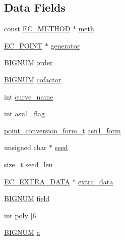 \subsection*{Data Fields}
\begin{DoxyCompactItemize}
\item 
const \hyperlink{crypto_2ec_2ec_8h_aeb4d9daf18f9bdcdb57abb1d97aa86c0}{E\+C\+\_\+\+M\+E\+T\+H\+OD} $\ast$ \hyperlink{structec__group__st_a2fc1498c0eb6bf4c024e00e73b172708}{meth}
\item 
\hyperlink{crypto_2ec_2ec_8h_ab372a34de16c42eb0ccfa63be0ad985f}{E\+C\+\_\+\+P\+O\+I\+NT} $\ast$ \hyperlink{structec__group__st_aa6cf7be35e1604915acde9174f0888c9}{generator}
\item 
\hyperlink{crypto_2ossl__typ_8h_a6fb19728907ec6515e4bfb716bffa141}{B\+I\+G\+N\+UM} \hyperlink{structec__group__st_a77ca4f31a55ba52d5c350376df44359a}{order}
\item 
\hyperlink{crypto_2ossl__typ_8h_a6fb19728907ec6515e4bfb716bffa141}{B\+I\+G\+N\+UM} \hyperlink{structec__group__st_a9f1826ab76db9a14f11e55a10d52fd7d}{cofactor}
\item 
int \hyperlink{structec__group__st_aa16a620b3b36d3f73e4e87e76bfcdad4}{curve\+\_\+name}
\item 
int \hyperlink{structec__group__st_a807067efd2305e23273f7046c7518150}{asn1\+\_\+flag}
\item 
\hyperlink{crypto_2ec_2ec_8h_aa2c7ec2902c397d59393d357921e14b5}{point\+\_\+conversion\+\_\+form\+\_\+t} \hyperlink{structec__group__st_a6f1f3af1fd02a6cffd8e3313ac201fe8}{asn1\+\_\+form}
\item 
unsigned char $\ast$ \hyperlink{structec__group__st_aefe76297c138dce3655224fea2e856f7}{seed}
\item 
size\+\_\+t \hyperlink{structec__group__st_a193bb331436bbc3a991ec1ecf4f211b1}{seed\+\_\+len}
\item 
\hyperlink{ec__lcl_8h_a8de7b9aa3907b2405eef5bf0a996e023}{E\+C\+\_\+\+E\+X\+T\+R\+A\+\_\+\+D\+A\+TA} $\ast$ \hyperlink{structec__group__st_a278cb953ee6bbe9081e486a5cd8ea868}{extra\+\_\+data}
\item 
\hyperlink{crypto_2ossl__typ_8h_a6fb19728907ec6515e4bfb716bffa141}{B\+I\+G\+N\+UM} \hyperlink{structec__group__st_a6969353956fcbe63a205705b1c3a96d0}{field}
\item 
int \hyperlink{structec__group__st_a54bd6c732eb42613c36515f5f879da8a}{poly} \mbox{[}6\mbox{]}
\item 
\hyperlink{crypto_2ossl__typ_8h_a6fb19728907ec6515e4bfb716bffa141}{B\+I\+G\+N\+UM} \hyperlink{structec__group__st_a879ee11fd9920649a3de1387b6c3fa22}{a}

\end{DoxyCompactItemize}
